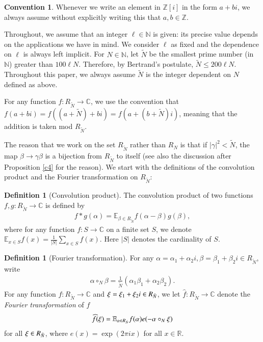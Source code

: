 \documentclass[12pt,amstex]{amsart}
\theoremstyle{definition}
\newtheorem{defn}[thm]{Definition}
\newtheorem{conv}[thm]{Convention}
\def \Z {\mathbb{Z}[i]}
\def \N {\mathbb{N}}
\def \A {\alpha}
\def \B {\beta}
\def \C {\gamma}
\def \R {R_{\tilde{N}}}
\def \x {\bold{\xi}}
\begin{document}
\begin{conv}\label{conv}
Whenever we write an element in $\Z$ in the form $a+bi$, we always assume without explicitly writing this that $a,b\in\mathbb{Z}$.

Throughout, we assume that an integer $\ell\in\mathbb{N}$ is given: its precise value depends on the applications we have in mind. We consider $\ell$ as fixed and the dependence on $\ell$ is always left implicit.
For $N\in\N$, let $\tilde{N}$ be the
smallest prime number (in $\N$) greater than $100\ell N$. Therefore, by Bertrand's postulate, $\tilde{N}\leq 200\ell N$.
Throughout this paper, we always assume $\tilde{N}$ is the integer dependent on $N$ defined as above.

For any function $f\colon\R\rightarrow\mathbb{C}$, we use the convention that $f(a+bi)=f((a+\tilde{N})+bi)=f(a+(b+\tilde{N})i)$, meaning that the addition is taken mod $\R$.
\end{conv}

The reason that we work on the set $\R$ rather than $R_{N}$ is that if $\vert\gamma\vert^{2}<\tilde{N}$, the map $\B\to\C\B$ is a bijection from $\R$ to itself (see also the discussion after Proposition \ref{c4} for the reason).
We start with the definitions of the convolution product and the Fourier transformation on $\R$:

\begin{defn}[Convolution product] The convolution product of two functions $f,g\colon\R\rightarrow\mathbb{C}$ is defined by
  \begin{equation}\nonumber
  \begin{split}
   f*g(\A)=\mathbb{E}_{\B\in \R}f(\A-\B)g(\B),
  \end{split}
  \end{equation}
where for any function $f\colon S\rightarrow\mathbb{C}$ on a finite set $S$, we denote $\mathbb{E}_{x\in S}f(x)=\frac{1}{\vert S\vert}\sum_{x\in S}f(x)$.
Here $\vert S\vert$ denotes the cardinality of $S$.
\end{defn}

\begin{defn}[Fourier transformation]  For any $\A=\A_{1}+\A_{2}i,\B=\B_{1}+\B_{2}i\in\R$, write
  \begin{equation}\nonumber
  \begin{split}
   \A\circ_{N}\B=\frac{1}{\tilde{N}}(\A_{1}\B_{1}+\A_{2}\B_{2}).
  \end{split}
  \end{equation}
  For any function $f\colon \R\rightarrow\mathbb{C}$ and $\x=\xi_{1}+\xi_{2}i\in \R$, we let $\widehat{f}\colon\R\rightarrow\mathbb{C}$ denote the \emph{Fourier transformation} of $f$
  \begin{equation}\nonumber
  \begin{split}
   \widehat{f}(\x)=\mathbb{E}_{\A\in \R}f(\A)e(-\A\circ_{N}\x)
  \end{split}
  \end{equation}
for all $\x\in\R$, where $e(x)=\exp(2\pi ix)$ for all $x\in\mathbb{R}$.
\end{defn}
\end{document}
